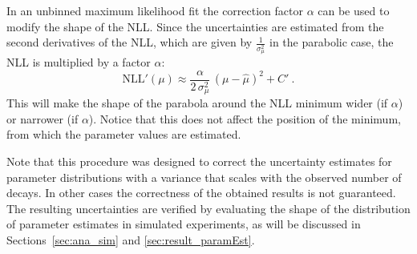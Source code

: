In an unbinned maximum likelihood fit the correction factor $\alpha$ can be used to modify the shape of the NLL. Since the uncertainties
are estimated from the second derivatives of the NLL, which are given by $\frac{1}{\sigma_\mu^2}$ in the parabolic case, the NLL is
multiplied by a factor $\alpha$:
\begin{equation}
  \label{eq:NLLPara_alpha}
  \text{NLL}'(\mu) \approx \frac{\alpha}{2\,\sigma_\mu^2}\, (\mu-\hat{\mu})^2 + C' \ .
\end{equation}
This will make the shape of the parabola around the NLL minimum wider (if $\alpha$) or narrower (if $\alpha$). Notice that
this does not affect the position of the minimum, from which the parameter values are estimated.

Note that this procedure was designed to correct the uncertainty estimates for parameter distributions with a variance that scales with the
observed number of decays. In other cases the correctness of the obtained results is not guaranteed. The resulting uncertainties are
verified by evaluating the shape of the distribution of parameter estimates in simulated experiments, as will be discussed in
Sections~\ref{sec:ana_sim} and \ref{sec:result_paramEst}.
